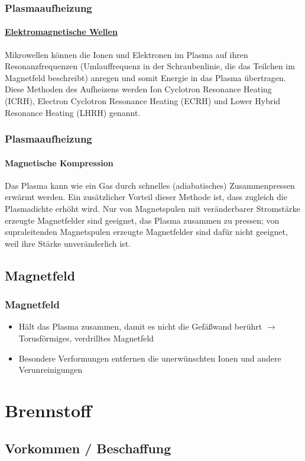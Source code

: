 \documentclass[aspectratio=169]{beamer}
\begin{document}
      \begin{frame}
        \frametitle{Plasmaaufheizung}
        \framesubtitle{\underline{Elektromagnetische Wellen}}
        Mikrowellen können die Ionen und Elektronen im Plasma auf ihren Resonanzfrequenzen (Umlauffrequenz in der Schraubenlinie, die das Teilchen im Magnetfeld beschreibt) anregen und somit Energie in das Plasma übertragen. Diese Methoden des Aufheizens werden Ion Cyclotron Resonance Heating (ICRH), Electron Cyclotron Resonance Heating (ECRH) und Lower Hybrid Resonance Heating (LHRH) genannt.
      \end{frame}

      \begin{frame}
        \frametitle{Plasmaaufheizung}
        \framesubtitle{Magnetische Kompression}
        Das Plasma kann wie ein Gas durch schnelles (adiabatisches) Zusammenpressen erwärmt werden. Ein zusätzlicher Vorteil dieser Methode ist, dass zugleich die Plasmadichte erhöht wird. Nur von Magnetspulen mit veränderbarer Stromstärke erzeugte Magnetfelder sind geeignet, das Plasma zusammen zu pressen; von supraleitenden Magnetspulen erzeugte Magnetfelder sind dafür nicht geeignet, weil ihre Stärke unveränderlich ist.
      \end{frame}

    \subsection{Magnetfeld}

      \begin{frame}
        \frametitle{Magnetfeld}
        \begin{itemize}
          \item Hält das Plasma zusammen, damit es nicht die Gefäßwand berührt
          \( \rightarrow \) Torusförmiges, verdrilltes Magnetfeld
          \item Besondere Verformungen entfernen die unerwünschten Ionen und andere Verunreinigungen

        \end{itemize}
      \end{frame}

  \section{Brennstoff}
    \subsection{Vorkommen / Beschaffung}
\end{document}
